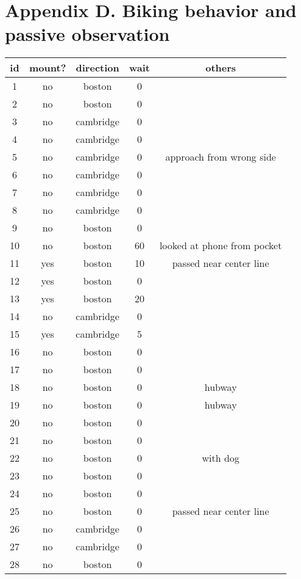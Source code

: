 \chapter{Appendix D. Biking behavior and passive observation}

\begin{longtable}{|c|c|c|c|c|}
\hline
id & mount? & direction & wait & others \\
\toprule
1 & no & boston & 0 & \\ \hline 
2 & no & boston & 0 & \\ \hline
3 & no & cambridge & 0 & \\ \hline
4 & no & cambridge & 0 & \\ \hline
5 & no & cambridge & 0 & approach from wrong side \\ \hline
6 & no & cambridge & 0 & \\ \hline
7 & no & cambridge & 0 & \\ \hline
8 & no & cambridge & 0 & \\ \hline
9 & no & boston & 0 & \\ \hline
10 & no & boston & 60 & looked at phone from pocket \\ \hline
11 & yes & boston & 10 & passed near center line \\ \hline
12 & yes & boston & 0 & \\ \hline
13 & yes & boston & 20 & \\ \hline
14 & no & cambridge & 0 & \\ \hline
15 & yes & cambridge & 5 \\ \hline
16 & no & boston & 0 & \\ \hline
17 & no & boston & 0 & \\ \hline
18 & no & boston & 0 & hubway \\ \hline
19 & no & boston & 0 & hubway \\ \hline
20 & no & boston & 0 & \\ \hline
21 & no & boston & 0 & \\ \hline
22 & no & boston & 0 & with dog \\ \hline
23 & no & boston & 0 & \\ \hline
24 & no & boston & 0 & \\ \hline
25 & no & boston & 0 & passed near center line \\ \hline
26 & no & cambridge & 0 & \\ \hline
27 & no & cambridge & 0 & \\ \hline
28 & no & boston & 0 & \\ \hline

\end{longtable}
